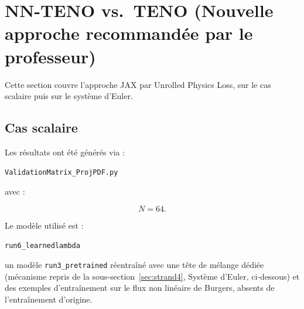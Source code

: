 \documentclass[11pt]{article}
\begin{document}

\section{NN-TENO vs.\ TENO (Nouvelle approche recommandée par le professeur)}
\label{sec:strand-new}

Cette section couvre l'approche JAX par Unrolled Physics Loss, sur le cas
scalaire puis sur le système d'Euler.

\subsection{Cas scalaire}
\label{sec:strand3}

Les résultats ont été générés via :

\texttt{ValidationMatrix\_ProjPDF.py}

avec :

\[
N=64.
\]

Le modèle utilisé est :

\texttt{run6\_learnedlambda}

un modèle \texttt{run3\_pretrained} réentraîné avec une tête de mélange
dédiée (mécanisme repris de la sous-section~\ref{sec:strand4}, Système
d'Euler, ci-dessous) et des exemples d'entraînement sur le flux non
linéaire de Burgers, absents de l'entraînement d'origine.
\end{document}
